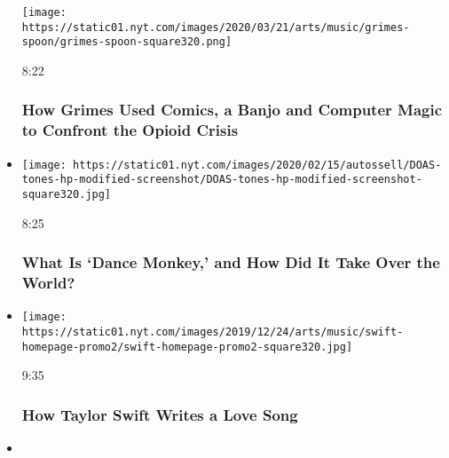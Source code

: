 \begin{itemize}
  \texttt{[image: https://static01.nyt.com/images/2020/03/21/arts/music/grimes-spoon/grimes-spoon-square320.png]}

  8:22

  \hypertarget{how-grimes-used-comics-a-banjo-and-computer-magic-to-confront-the-opioid-crisis}{%
  \subsubsection{How Grimes Used Comics, a Banjo and Computer Magic to
  Confront the Opioid
  Crisis}\label{how-grimes-used-comics-a-banjo-and-computer-magic-to-confront-the-opioid-crisis}}
\item
  \href{https://www.nytimes.com/video/arts/music/100000006787476/dance-monkey-tones-and-i.html?action=click\&module=video-series-bar\&region=header\&pgtype=Article\&playlistId=video/diaryofasong}{}

  \texttt{[image: https://static01.nyt.com/images/2020/02/15/autossell/DOAS-tones-hp-modified-screenshot/DOAS-tones-hp-modified-screenshot-square320.jpg]}

  8:25

  \hypertarget{what-is-dance-monkey-and-how-did-it-take-over-the-world}{%
  \subsubsection{What Is `Dance Monkey,' and How Did It Take Over the
  World?}\label{what-is-dance-monkey-and-how-did-it-take-over-the-world}}
\item
  \href{https://www.nytimes.com/video/arts/music/100000006843387/taylor-swift-lover.html?action=click\&module=video-series-bar\&region=header\&pgtype=Article\&playlistId=video/diaryofasong}{}

  \texttt{[image: https://static01.nyt.com/images/2019/12/24/arts/music/swift-homepage-promo2/swift-homepage-promo2-square320.jpg]}

  9:35

  \hypertarget{how-taylor-swift-writes-a-love-song}{%
  \subsubsection{How Taylor Swift Writes a Love
  Song}\label{how-taylor-swift-writes-a-love-song}}
\item
  \href{https://www.nytimes.com/video/arts/music/100000006794269/fka-twigs-mary-magdalene.html?action=click\&module=video-series-bar\&region=header\&pgtype=Article\&playlistId=video/diaryofasong}{}


\end{itemize}
